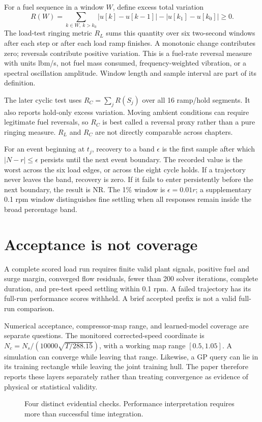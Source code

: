 \documentclass[11pt,a4paper,oneside]{report}
\begin{document}
For a fuel sequence in a window $W$, define excess total variation
\begin{equation}
R(W)=\sum_{k\in W,\ k>k_0}|u[k]-u[k-1]|-|u[k_1]-u[k_0]|\geq0.
\label{eq:ring}
\end{equation}
The load-test ringing metric $R_L$ sums this quantity over six two-second windows after each step or after each load ramp finishes. A monotonic change contributes zero; reversals contribute positive variation. This is a fuel-rate reversal measure with units lbm/s, not fuel mass consumed, frequency-weighted vibration, or a spectral oscillation amplitude. Window length and sample interval are part of its definition.

The later cyclic test uses $R_C=\sum_jR(S_j)$ over all 16 ramp/hold segments. It also reports hold-only excess variation. Moving ambient conditions can require legitimate fuel reversals, so $R_C$ is best called a reversal proxy rather than a pure ringing measure. $R_L$ and $R_C$ are not directly comparable across chapters.

For an event beginning at $t_j$, recovery to a band $\epsilon$ is the first sample after which $|N-r|\leq\epsilon$ persists until the next event boundary. The recorded value is the worst across the six load edges, or across the eight cycle holds. If a trajectory never leaves the band, recovery is zero. If it fails to enter persistently before the next boundary, the result is NR. The 1\% window is $\epsilon=0.01r$; a supplementary 0.1 rpm window distinguishes fine settling when all responses remain inside the broad percentage band.

\section{Acceptance is not coverage}
A complete scored load run requires finite valid plant signals, positive fuel and surge margin, converged flow residuals, fewer than 200 solver iterations, complete duration, and pre-test speed settling within 0.1 rpm. A failed trajectory has its full-run performance scores withheld. A brief accepted prefix is not a valid full-run comparison.

Numerical acceptance, compressor-map range, and learned-model coverage are separate questions. The monitored corrected-speed coordinate is $N_c=N_s/(10000\sqrt{T/288.15})$, with a working map range $[0.5,1.05]$. A simulation can converge while leaving that range. Likewise, a GP query can lie in its training rectangle while leaving the joint training hull. The paper therefore reports these layers separately rather than treating convergence as evidence of physical or statistical validity.
\begin{figure}[htbp]\centering\diagramEvidence
\caption{Four distinct evidential checks. Performance interpretation requires more than successful time integration.}\label{fig:evidence}\end{figure}
\end{document}
